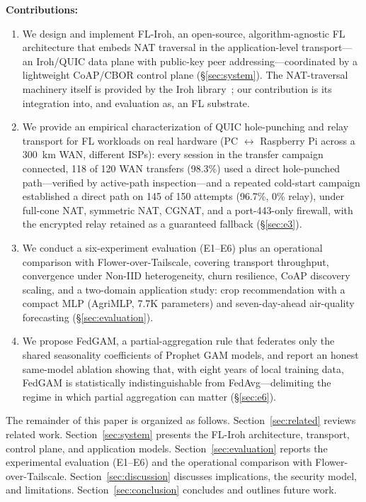 \documentclass[a4paper,fleqn]{cas-dc}
\begin{document}
\noindent\textbf{Contributions:}
\begin{enumerate}
    \item We design and implement FL-Iroh, an open-source, algorithm-agnostic FL architecture that embeds NAT traversal in the application-level transport---an Iroh\slash QUIC data plane with public-key peer addressing---coordinated by a lightweight CoAP\slash CBOR control plane (\S\ref{sec:system}). The NAT-traversal machinery itself is provided by the Iroh library~\cite{iroh2024}; our contribution is its integration into, and evaluation as, an FL substrate.
    \item We provide an empirical characterization of QUIC hole-punching and relay transport for FL workloads on real hardware (PC $\leftrightarrow$ Raspberry Pi across a 300~km WAN, different ISPs): every session in the transfer campaign connected, 118 of 120 WAN transfers (98.3\%) used a direct hole-punched path---verified by active-path inspection---and a repeated cold-start campaign established a direct path on 145 of 150 attempts (96.7\%, 0\% relay), under full-cone NAT, symmetric NAT, CGNAT, and a port-443-only firewall, with the encrypted relay retained as a guaranteed fallback (\S\ref{sec:e3}).
    \item We conduct a six-experiment evaluation (E1--E6) plus an operational comparison with Flower-over-Tailscale, covering transport throughput, convergence under Non-IID heterogeneity, churn resilience, CoAP discovery scaling, and a two-domain application study: crop recommendation with a compact MLP (AgriMLP, 7.7K parameters) and seven-day-ahead air-quality forecasting (\S\ref{sec:evaluation}).
    \item We propose FedGAM, a partial-aggregation rule that federates only the shared seasonality coefficients of Prophet GAM models, and report an honest same-model ablation showing that, with eight years of local training data, FedGAM is statistically indistinguishable from FedAvg---delimiting the regime in which partial aggregation can matter (\S\ref{sec:e6}).
\end{enumerate}

The remainder of this paper is organized as follows. Section~\ref{sec:related} reviews related work. Section~\ref{sec:system} presents the FL-Iroh architecture, transport, control plane, and application models. Section~\ref{sec:evaluation} reports the experimental evaluation (E1--E6) and the operational comparison with Flower-over-Tailscale. Section~\ref{sec:discussion} discusses implications, the security model, and limitations. Section~\ref{sec:conclusion} concludes and outlines future work.
\end{document}
